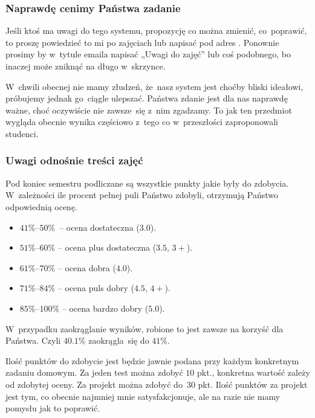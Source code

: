 \documentclass[10pt,t]{beamer}
\begin{document}
\begin{frame}
  \frametitle{Naprawdę cenimy Państwa zadanie}


  Jeśli ktoś ma uwagi do tego systemu, propozycję co można zmienić,
  co~poprawić, to proszę powiedzieć to mi po zajęciach lub napisać pod
  adres \email. Ponownie prosimy by w~tytule emaila napisać „Uwagi do zajęć”
  lub coś podobnego, bo inaczej może zniknąć na długo w~skrzynce.

  W~chwili obecnej nie mamy złudzeń, że~nasz system jest choćby bliski
  ideałowi, próbujemy jednak go~ciągle ulepszać. Państwa zdanie jest dla
  nas naprawdę ważne, choć oczywiście nie zawsze~się z~nim zgadzamy.
  To jak ten przedmiot wygląda obecnie wynika częściowo z~tego co
  w~przeszłości zaproponowali studenci.

\end{frame}





\begin{frame}
  \frametitle{Uwagi odnośnie treści zajęć}


  Pod koniec semestru podliczane są wszystkie punkty jakie były do
  zdobycia. W~zależności ile procent pełnej puli Państwo zdobyli, otrzymują
  Państwo odpowiednią ocenę.

  \vspace{-0.3em}



  \begin{itemize}

  \item $41\%\text{--}50\%$~-- ocena dostateczna ($3.0$).

  \item $51\%\text{--}60\%$ -- ocena plus dostateczna ($3.5$, $3+$).

  \item $61\%\text{--}70\%$ -- ocena dobra ($4.0$).

  \item $71\%\text{--}84\%$ -- ocena puls dobry ($4.5$, $4+$).

  \item $85\%\text{--}100\%$ -- ocena bardzo dobry ($5.0$).

  \end{itemize}

  \vspace{-0.3em}



  W~przypadku zaokrąglanie wyników, robione to jest zawsze na korzyść dla
  Państwa. Czyli $40.1\%$ zaokrągla~się do $41\%$.

  Ilość punktów do zdobycie jest będzie jawnie podana przy każdym
  konkretnym zadaniu domowym. Za jeden test można zdobyć $10$ pkt.,
  konkretna wartość zależy od zdobytej oceny. Za projekt można zdobyć
  do~$30$ pkt. Ilość punktów za projekt jest tym, co obecnie najmniej mnie
  satysfakcjonuje, ale na razie nie mamy pomysłu jak to poprawić.

\end{frame}
\end{document}
